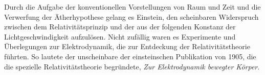 \begin{nohyphens}
Durch die Aufgabe der konventionellen Vorstellungen von Raum und Zeit und die Verwerfung der Ätherhypothese gelang es Einstein, den scheinbaren Widerspruch zwischen dem Relativitätsprinzip und der aus der  folgenden Konstanz der Lichtgeschwindigkeit aufzulösen. Nicht zufällig waren es Experimente und Überlegungen zur Elektrodynamik, die zur Entdeckung der Relativitätstheorie führten. So lautete der unscheinbare  der einsteinschen Publikation von 1905, die die spezielle Relativitätstheorie begründete, \textit{Zur Elektrodynamik bewegter Körper}.

\end{nohyphens}

